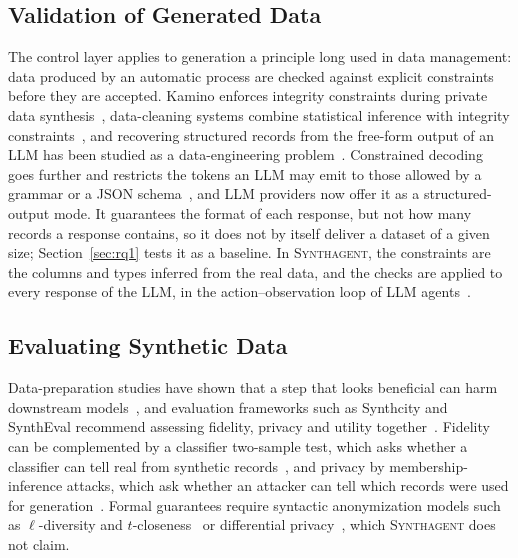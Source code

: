 \documentclass[conference]{IEEEtran}
\newcommand{\system}{\textsc{Synthagent}\xspace}
\begin{document}
\subsection{Validation of Generated Data}
The control layer applies to generation a principle long used in data management: data produced by an automatic process are checked against explicit constraints before they are accepted. Kamino enforces integrity constraints during private data synthesis~\cite{ge2021kamino}, data-cleaning systems combine statistical inference with integrity constraints~\cite{chu2013holistic,qin2024bclean}, and recovering structured records from the free-form output of an LLM has been studied as a data-engineering problem~\cite{rorseth2026recovering}. Constrained decoding goes further and restricts the tokens an LLM may emit to those allowed by a grammar or a JSON schema~\cite{willard2023outlines,geng2023grammar}, and LLM providers now offer it as a structured-output mode. It guarantees the format of each response, but not how many records a response contains, so it does not by itself deliver a dataset of a given size; Section~\ref{sec:rq1} tests it as a baseline. In \system, the constraints are the columns and types inferred from the real data, and the checks are applied to every response of the LLM, in the action--observation loop of LLM agents~\cite{yao2023react,wang2024agentsurvey}.

\subsection{Evaluating Synthetic Data}
Data-preparation studies have shown that a step that looks beneficial can harm downstream models~\cite{li2021cleanml,guha2023cleaningfairness}, and evaluation frameworks such as Synthcity and SynthEval recommend assessing fidelity, privacy and utility together~\cite{qian2023synthcity,lautrup2025syntheval}. Fidelity can be complemented by a classifier two-sample test, which asks whether a classifier can tell real from synthetic records~\cite{lopezpaz2017c2st}, and privacy by membership-inference attacks, which ask whether an attacker can tell which records were used for generation~\cite{shokri2017mia,hyeong2022tabularmia}. Formal guarantees require syntactic anonymization models such as $\ell$-diversity and $t$-closeness~\cite{machanavajjhala2006ldiversity,li2007tcloseness} or differential privacy~\cite{dwork2014dp}, which \system does not claim.

\end{document}
